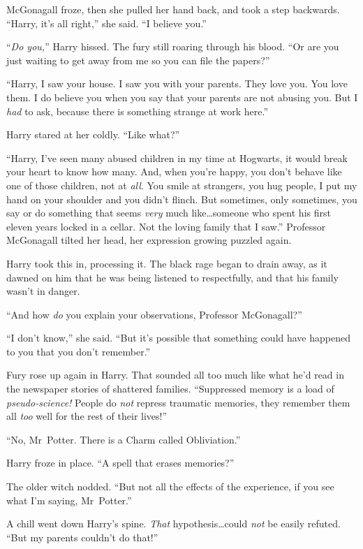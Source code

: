 McGonagall froze, then she pulled her hand back, and took a step backwards. “Harry, it’s all right,” she said. “I believe you.”

“\emph{Do you,}” Harry hissed. The fury still roaring through his blood. “Or are you just waiting to get away from me so you can file the papers?”

“Harry, I saw your house. I saw you with your parents. They love you. You love them. I do believe you when you say that your parents are not abusing you. But I \emph{had} to ask, because there is something strange at work here.”

Harry stared at her coldly. “Like what?”

“Harry, I’ve seen many abused children in my time at Hogwarts, it would break your heart to know how many. And, when you’re happy, you don’t behave like one of those children, not at \emph{all}. You smile at strangers, you hug people, I put my hand on your shoulder and you didn’t flinch. But sometimes, only sometimes, you say or do something that seems \emph{very} much like…someone who spent his first eleven years locked in a cellar. Not the loving family that I saw.” Professor McGonagall tilted her head, her expression growing puzzled again.

Harry took this in, processing it. The black rage began to drain away, as it dawned on him that he was being listened to respectfully, and that his family wasn’t in danger.

“And how \emph{do} you explain your observations, Professor McGonagall?”

“I don’t know,” she said. “But it’s possible that something could have happened to you that you don’t remember.”

Fury rose up again in Harry. That sounded all too much like what he’d read in the newspaper stories of shattered families. “Suppressed memory is a load of \emph{pseudo-science!} People do \emph{not} repress traumatic memories, they remember them all \emph{too} well for the rest of their lives!”

“No, Mr~Potter. There is a Charm called Obliviation.”

Harry froze in place. “A spell that erases memories?”

The older witch nodded. “But not all the effects of the experience, if you see what I’m saying, Mr~Potter.”

A chill went down Harry’s spine. \emph{That} hypothesis…could \emph{not} be easily refuted. “But my parents couldn’t do that!”

